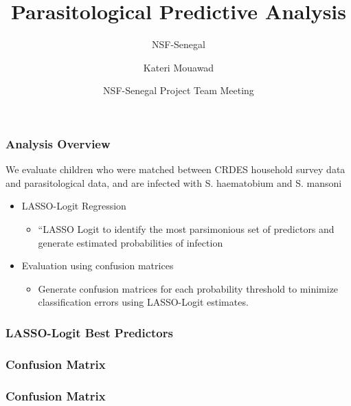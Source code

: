 \documentclass{beamer}
\title[Predictive Analysis] %
{Parasitological Predictive Analysis}
\subtitle{NSF-Senegal}
\author{Kateri Mouawad} %
\date[June 2025] %
{NSF-Senegal Project Team Meeting}
\begin{document}
\frame{\titlepage}

\begin{frame}
\frametitle{Analysis Overview}
We evaluate children who were matched between CRDES household survey data and parasitological data, and are infected with S. haematobium and S. mansoni \\

\begin{itemize}
    \item<1-> LASSO-Logit Regression
       \begin{itemize}
             \item<2-> “LASSO Logit to identify the most parsimonious set of predictors and generate estimated probabilities of infection
        \end{itemize}
    \item<3-> Evaluation using confusion matrices
         \begin{itemize}
                 \item<4-> Generate confusion matrices for each probability threshold to minimize classification errors using LASSO-Logit estimates.
         \end{itemize}
\end{itemize}

\end{frame}


\begin{frame}
\frametitle{LASSO-Logit Best Predictors}





\end{frame}

\begin{frame}
\frametitle{Confusion Matrix}





\end{frame}

\begin{frame}
\frametitle{Confusion Matrix}



\end{frame}
\end{document}
